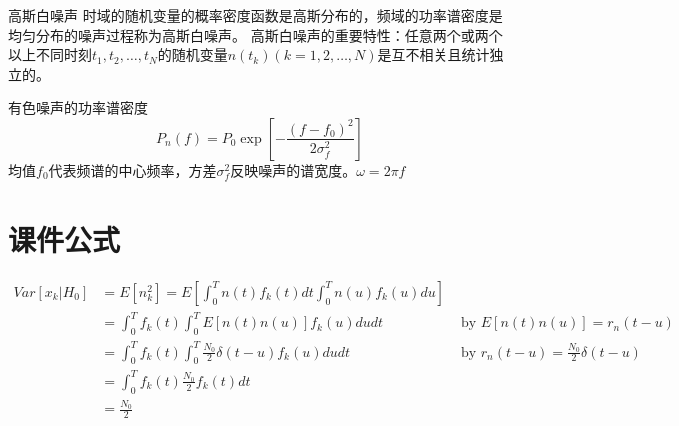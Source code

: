 \begin{frame}
\begin{block}{高斯白噪声}
	时域的随机变量的概率密度函数是高斯分布的，频域的功率谱密度是均匀分布的噪声过程称为高斯白噪声。
	高斯白噪声的重要特性：任意两个或两个以上不同时刻$t_1,t_2,\dots,t_N$的随机变量$n(t_k) (k=1,2,\dots,N)$是互不相关且统计独立的。
\end{block}
\begin{block}{有色噪声的功率谱密度}
	\[P_n(f) =P_0\exp[-\frac{(f-f_0)^2}{2\sigma_f^2}]\]
	均值$f_0$代表频谱的中心频率，方差$\sigma_f^2$反映噪声的谱宽度。$\omega=2\pi f$
\end{block}
\end{frame}

\section{课件公式}

\begin{frame}
\begin{align*}
Var[x_k|H_0]&=E[n_k^2]=E[\int_{0}^{T}n(t)f_k(t)dt\int_{0}^{T}n(u)f_k(u)du]&\\
&=\int_{0}^{T}f_k(t)\int_{0}^{T}E[n(t)n(u)]f_k(u)dudt& \text{ by }E[n(t)n(u)]=r_n(t-u)\\
&=\int_{0}^{T}f_k(t)\int_{0}^{T}\frac{N_0}{2}\delta(t-u)f_k(u)dudt&\text{ by } r_n(t-u)=\frac{N_0}{2}\delta(t-u)\\
&=\int_{0}^{T}f_k(t)\frac{N_0}{2}f_k(t)dt&\\
&=\frac{N_0}{2}&
\end{align*}
\end{frame}

